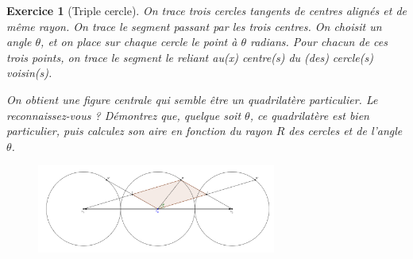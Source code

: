 \documentclass[12pt]{article}
\theoremstyle{break}
\newtheorem{exo}{Exercice}
\begin{document}
\begin{exo}[Triple cercle]
On trace trois cercles tangents de centres alignés et de même rayon. On trace le segment passant par les trois centres. On choisit un angle $\theta$, et on place sur chaque cercle le point à $\theta$ radians. Pour chacun de ces trois points, on trace le segment le reliant au(x) centre(s) du (des) cercle(s) voisin(s).

On obtient une figure centrale qui semble être un quadrilatère particulier. Le reconnaissez-vous ? Démontrez que, quelque soit $\theta$, ce quadrilatère est bien particulier, puis calculez son aire en fonction du rayon $R$ des cercles et de l'angle $\theta$.

\begin{figure}[h!]
	\centering
    \includegraphics[width=0.7\textwidth]{TripleCercle.png}
    
\end{figure}
\end{exo}
\end{document}
